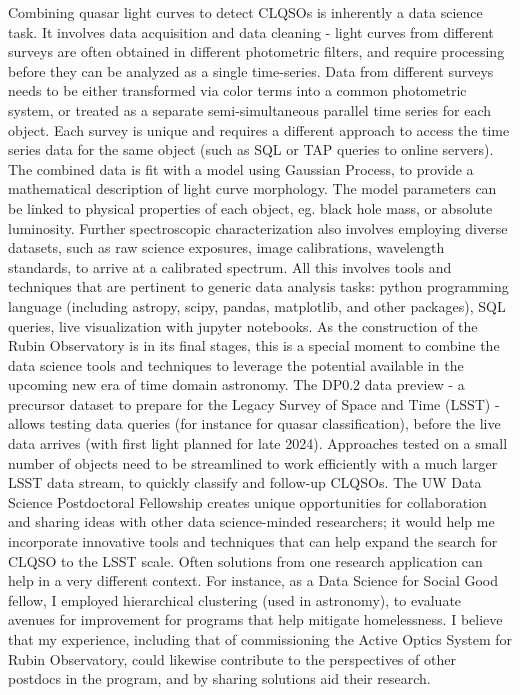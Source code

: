 \documentclass{aastex631}
\begin{document}
Combining quasar light curves to detect CLQSOs is inherently a data science task. It involves data acquisition and  data cleaning - light curves from different surveys are often obtained in different photometric filters, and require processing before they can be analyzed as a single time-series. Data from different surveys needs to be either transformed via color terms into a common photometric system, or treated as a separate semi-simultaneous parallel time series for each object. Each survey is unique and requires a different approach to access the time series data for the same object (such as SQL or TAP  queries to online servers). The combined data is fit with a model using Gaussian Process, to provide a mathematical  description of light curve morphology. The model parameters can be linked to physical properties of each object, eg. black hole mass, or absolute luminosity.  Further spectroscopic characterization  also involves employing diverse datasets, such as raw science exposures, image calibrations, wavelength standards, to arrive at a calibrated spectrum. All this involves tools and techniques that are pertinent to generic data analysis tasks: python programming language (including astropy, scipy, pandas, matplotlib, and other packages), SQL queries, live visualization with jupyter notebooks. As the construction of the Rubin Observatory is in its final stages, this is a special moment to combine the data science tools and techniques to leverage the potential available in the upcoming new era of time domain astronomy. The DP0.2 data preview - a precursor dataset to prepare for the Legacy Survey of Space and Time (LSST) - allows testing data queries (for instance for quasar classification), before the live data arrives (with first light planned for late 2024). Approaches tested on a small number of objects need to be streamlined to work efficiently with a much larger LSST data stream, to quickly classify and follow-up CLQSOs. The UW Data Science Postdoctoral Fellowship creates unique opportunities for collaboration and sharing ideas with other data science-minded researchers; it would help me incorporate innovative tools and techniques that can help expand the search for CLQSO to the LSST scale. Often solutions from one research application can help in a very different context. For instance, as a Data Science for Social Good fellow, I employed hierarchical clustering  (used in astronomy), to evaluate avenues for improvement for programs that help mitigate homelessness. I believe that my experience, including that of commissioning the Active Optics System for Rubin Observatory, could likewise contribute to the perspectives of other postdocs in the program, and by sharing solutions aid their research. 

{}

\end{document}
